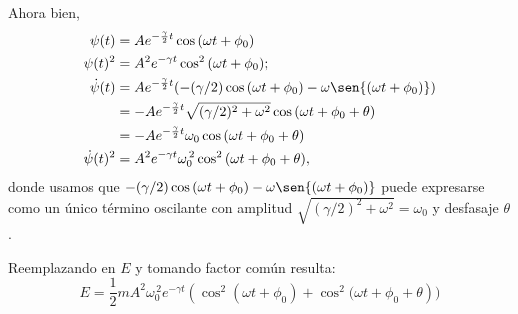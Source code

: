 \documentclass[a4paper,spanish]{article}
\providecommand{\vmed}[1]{\langle#1\rangle}
\numberwithin{equation}{section}
\begin{document}
Ahora bien,
		\begin{align*}
			\psi(t) & = A e^{-\frac{\gamma}{2}t} \cos{(\omega t + \phi_0)}\\
			\psi(t)^2 & = A^2 e^{-\gamma t} \cos^2{(\omega t + \phi_0)};\\
			\dot{\psi}(t) &= A e^{-\frac{\gamma}{2}t} ( -(\gamma/2) \cos{(\omega t + \phi_0)}
				- \omega \sen{(\omega t + \phi_0)} )\\
				&= -A e^{-\frac{\gamma}{2}t} \sqrt{(\gamma/2)^2+\omega^2} \cos{(\omega t + \phi_0 + \theta)}\\
				&= -A e^{-\frac{\gamma}{2}t} \omega_0 \cos{(\omega t + \phi_0 + \theta)}\\
			\dot{\psi}(t)^2 &= A^2 e^{-\gamma t} \omega_0^{\,2} \cos^2{(\omega t + \phi_0 + \theta)},
		\end{align*}
donde usamos que $-(\gamma/2) \cos{(\omega t + \phi_0)} - \omega \sen{(\omega t + \phi_0)}$ puede expresarse como un \'unico t\'ermino oscilante con amplitud $\sqrt{(\gamma/2)^2+\omega^2}=\omega_0$ y desfasaje $\theta$.

Reemplazando en $E$ y tomando factor com\'un resulta:
		\[
			E = \frac{1}{2}m A^2 \omega_0^{\,2} e^{-\gamma t} 
				(\cos^2{(\omega t + \phi_0)} + \cos^2{(\omega t + \phi_0 + \theta}))
		\]




\end{document}

